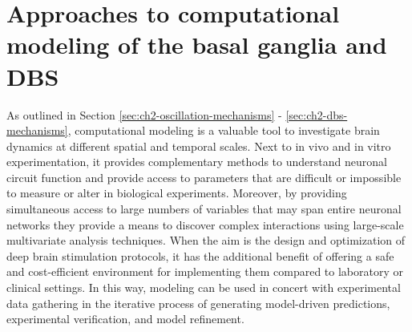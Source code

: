 %
%
%
\section{Approaches to computational modeling of the basal ganglia and DBS}
%
%
%
%
%
%
%
%
%
%
%
%
%
%
%
%
%
%
%
%
%

As outlined in Section \ref{sec:ch2-oscillation-mechanisms} - \ref{sec:ch2-dbs-mechanisms},
computational modeling is a valuable tool to investigate brain dynamics
at different spatial and temporal scales. Next to in vivo and in vitro
experimentation, it provides complementary methods to understand neuronal
circuit function and provide access to parameters that are difficult or impossible
to measure or alter in biological experiments. Moreover, by providing simultaneous
access to large numbers of variables that may span entire neuronal networks
they provide a means to discover complex interactions using large-scale
multivariate analysis techniques. When the aim is the design and optimization
of deep brain stimulation protocols, it has the additional benefit of
offering a safe and cost-efficient environment for implementing them
compared to laboratory or clinical settings. In this way, modeling
can be used in concert with experimental data gathering in the iterative
process of generating model-driven predictions, experimental verification,
and model refinement.

